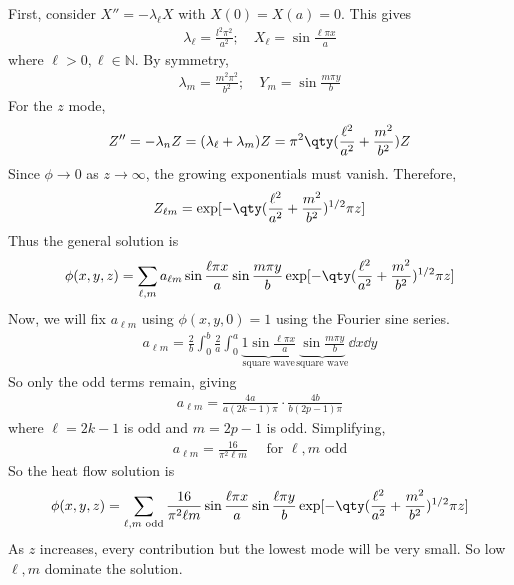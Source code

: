 First, consider $X'' = -\lambda_\ell X$ with $X(0) = X(a) = 0$.
This gives
\begin{align*}
	\lambda_\ell = \frac{l^2 \pi^2}{a^2};\quad X_\ell = \sin \frac{\ell \pi x}{a}
\end{align*}
where $\ell > 0, \ell \in \mathbb N$.
By symmetry,
\begin{align*}
	\lambda_m = \frac{m^2 \pi^2}{b^2};\quad Y_m = \sin \frac{m \pi y}{b}
\end{align*}
For the $z$ mode,
\begin{align*}
	Z'' = -\lambda_n Z = (\lambda_\ell + \lambda_m) Z = \pi^2\qty(\frac{\ell^2}{a^2} + \frac{m^2}{b^2}) Z
\end{align*}
Since $\phi \to 0$ as $z \to \infty$, the growing exponentials must vanish.
Therefore,
\begin{align*}
	Z_{\ell m} = \exp[-\qty(\frac{\ell^2}{a^2} + \frac{m^2}{b^2})^{1/2} \pi z]
\end{align*}
Thus the general solution is
\begin{align*}
	\phi(x,y,z) = \sum_{\ell, m} a_{\ell m} \sin \frac{\ell \pi x}{a} \sin \frac{m \pi y}{b} \exp[-\qty(\frac{\ell^2}{a^2} + \frac{m^2}{b^2})^{1/2} \pi z]
\end{align*}
Now, we will fix $a_{\ell m}$ using $\phi(x,y,0) = 1$ using the Fourier sine series.
\begin{align*}
	a_{\ell m} = \frac{2}{b} \int_0^b \frac{2}{a} \int_0^a \underbrace{1 \sin \frac{\ell \pi x}{a}}_{\text{square wave}} \underbrace{\sin \frac{m \pi y}{b}}_{\text{square wave}} \dd{x} \dd{y}
\end{align*}
So only the odd terms remain, giving
\begin{align*}
	a_{\ell m} = \frac{4a}{a(2k-1)\pi} \cdot \frac{4b}{b(2p-1) \pi}
\end{align*}
where $\ell = 2k-1$ is odd and $m = 2p-1$ is odd.
Simplifying,
\begin{align*}
	a_{\ell m} = \frac{16}{\pi^2 \ell m} \quad \text{ for } \ell, m \text{ odd}
\end{align*}
So the heat flow solution is
\begin{align*}
	\phi(x,y,z) = \sum_{\ell, m \text{ odd}} \frac{16}{\pi^2 \ell m} \sin \frac{\ell \pi x}{a} \sin \frac{\ell \pi y}{b} \exp[-\qty(\frac{\ell^2}{a^2} + \frac{m^2}{b^2})^{1/2} \pi z]
\end{align*}
As $z$ increases, every contribution but the lowest mode will be very small.
So low $\ell, m$ dominate the solution.

